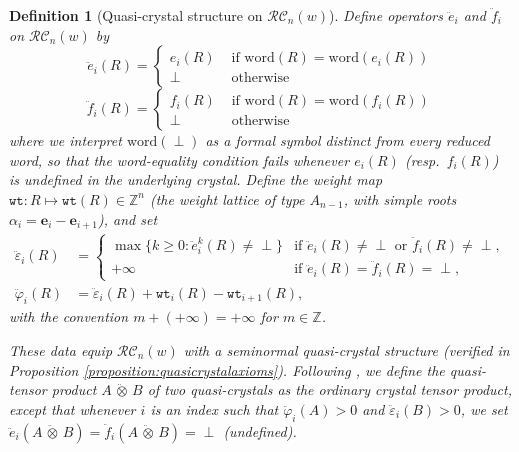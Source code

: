 \documentclass[pdflatex,sn-mathphys-num]{sn-jnl}
\numberwithin{equation}{subsection}
\newcommand{\wtt}{\mathtt{wt}}
\newcommand{\RC}{\mathcal{RC}}
\theoremstyle{thmstyleone}
\theoremstyle{thmstylethree}
\newtheorem{definition}[lemma]{Definition}
\theoremstyle{thmstyletwo}
\begin{document}
\begin{definition}[Quasi-crystal structure on $\RC_n(w)$]\label{definition:quasicrystal}
Define operators $\ddot{e}_i$ and $\ddot{f}_i$ on $\RC_n(w)$ by
$$\ddot{e}_i(R) = \begin{cases}
  e_i(R) & \text{ if }\mathrm{word}(R) = \mathrm{word}(e_i(R))\\
  \perp & \text{ otherwise}
\end{cases}$$
$$\ddot{f}_i(R) = \begin{cases}
  f_i(R) & \text{ if }\mathrm{word}(R) = \mathrm{word}(f_i(R))\\
  \perp & \text{ otherwise}
\end{cases}$$
where we interpret $\mathrm{word}(\perp)$ as a formal symbol distinct from every reduced word, so that the word-equality condition fails whenever $e_i(R)$ (resp.\ $f_i(R)$) is undefined in the underlying crystal. Define the weight map $\wtt:R\mapsto\wtt(R)\in\mathbb{Z}^n$ (the weight lattice of type $A_{n-1}$, with simple roots $\alpha_i=\mathbf{e}_i-\mathbf{e}_{i+1}$), and set
\begin{align*}
\ddot{\varepsilon}_i(R) &= \begin{cases}\max\{k\geq 0:\ddot{e}_i^k(R)\neq\perp\}&\text{if }\ddot{e}_i(R)\neq\perp\text{ or }\ddot{f}_i(R)\neq\perp,\\ +\infty &\text{if }\ddot{e}_i(R)=\ddot{f}_i(R)=\perp,\end{cases}\\
\ddot{\varphi}_i(R) &= \ddot{\varepsilon}_i(R) + \wtt_i(R)-\wtt_{i+1}(R),
\end{align*}
with the convention $m+(+\infty)=+\infty$ for $m\in\mathbb{Z}$.

These data equip $\RC_n(w)$ with a seminormal quasi-crystal structure (verified in Proposition \ref{proposition:quasicrystalaxioms}). Following \cite{cain2023quasicrystals}, we define the quasi-tensor product $A\,\ddot{\otimes}\,B$ of two quasi-crystals as the ordinary crystal tensor product, except that whenever $i$ is an index such that $\ddot{\varphi}_i(A)>0$ and $\ddot{\varepsilon}_i(B)>0$, we set $\ddot{e}_i(A\,\ddot{\otimes}\,B)=\ddot{f}_i(A\,\ddot{\otimes}\,B)=\perp$ (undefined).
\end{definition}
\end{document}
